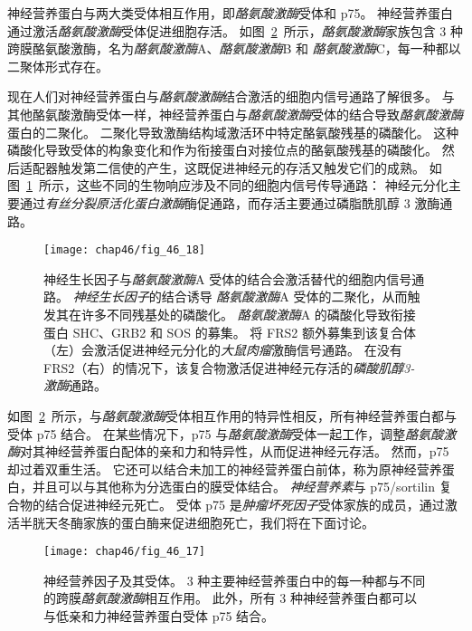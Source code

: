 神经营养蛋白与两大类受体相互作用，即\textit{酪氨酸激酶}受体和 p75。
神经营养蛋白通过激活\textit{酪氨酸激酶}受体促进细胞存活。
如图~\ref{fig:46_17}~所示，\textit{酪氨酸激酶}家族包含 3 种跨膜酪氨酸激酶，名为\textit{酪氨酸激酶}A、\textit{酪氨酸激酶}B 和 \textit{酪氨酸激酶}C，每一种都以二聚体形式存在。


现在人们对神经营养蛋白与\textit{酪氨酸激酶}结合激活的细胞内信号通路了解很多。
与其他酪氨酸激酶受体一样，神经营养蛋白与\textit{酪氨酸激酶}受体的结合导致\textit{酪氨酸激酶}蛋白的二聚化。
二聚化导致激酶结构域激活环中特定酪氨酸残基的磷酸化。
这种磷酸化导致受体的构象变化和作为衔接蛋白对接位点的酪氨酸残基的磷酸化。
然后适配器触发第二信使的产生，这既促进神经元的存活又触发它们的成熟。
如图~\ref{fig:46_18}~所示，这些不同的生物响应涉及不同的细胞内信号传导通路：
神经元分化主要通过\textit{有丝分裂原活化蛋白激酶}酶促通路，而存活主要通过磷脂酰肌醇 3 激酶通路。


\begin{figure}[htbp]
	\centering
	\texttt{[image: chap46/fig\_46\_18]}
	\caption{神经生长因子与\textit{酪氨酸激酶}A 受体的结合会激活替代的细胞内信号通路。
		\textit{神经生长因子}的结合诱导 \textit{酪氨酸激酶}A 受体的二聚化，从而触发其在许多不同残基处的磷酸化。
		\textit{酪氨酸激酶}A 的磷酸化导致衔接蛋白 SHC、GRB2 和 SOS 的募集。
		将 FRS2 额外募集到该复合体（左）会激活促进神经元分化的\textit{大鼠肉瘤}激酶信号通路。
		在没有 FRS2（右）的情况下，该复合物激活促进神经元存活的\textit{磷酸肌醇3-激酶}通路。}
	\label{fig:46_18}
\end{figure}


如图~\ref{fig:46_17}~所示，与\textit{酪氨酸激酶}受体相互作用的特异性相反，所有神经营养蛋白都与受体 p75 结合。
在某些情况下，p75 与\textit{酪氨酸激酶}受体一起工作，调整\textit{酪氨酸激酶}对其神经营养蛋白配体的亲和力和特异性，从而促进神经元存活。
然而，p75 却过着双重生活。
它还可以结合未加工的神经营养蛋白前体，称为原神经营养蛋白，并且可以与其他称为分选蛋白的膜受体结合。
\textit{神经营养素}与 p75/sortilin 复合物的结合促进神经元死亡。
受体 p75 是\textit{肿瘤坏死因子}受体家族的成员，通过激活半胱天冬酶家族的蛋白酶来促进细胞死亡，我们将在下面讨论。


\begin{figure}[htbp]
	\centering
	\texttt{[image: chap46/fig\_46\_17]}
	\caption{神经营养因子及其受体。
		3 种主要神经营养蛋白中的每一种都与不同的跨膜\textit{酪氨酸激酶}相互作用。
		此外，所有 3 种神经营养蛋白都可以与低亲和力神经营养蛋白受体 p75 结合\cite{reichardt1997neurotrophic}。}
	\label{fig:46_17}
\end{figure}


